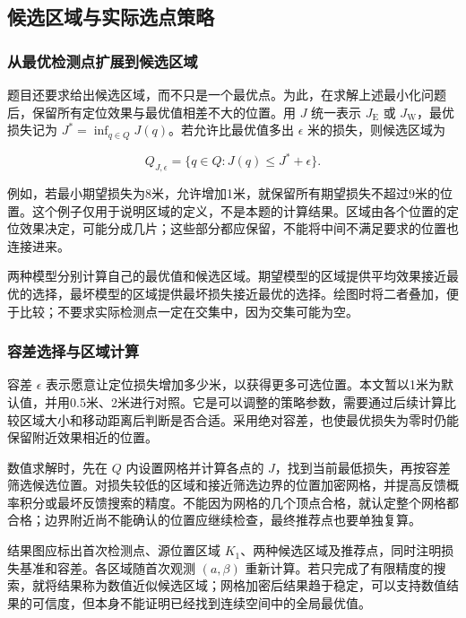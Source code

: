 \subsection{候选区域与实际选点策略}

\subsubsection{从最优检测点扩展到候选区域}

题目还要求给出候选区域，而不只是一个最优点。为此，在求解上述最小化问题后，保留所有定位效果与最优值相差不大的位置。用 \(J\) 统一表示 \(J_{\mathrm E}\) 或 \(J_{\mathrm W}\)，最优损失记为 \(J^*=\inf_{q\in Q}J(q)\)。若允许比最优值多出 \(\epsilon\) 米的损失，则候选区域为

\begin{equation}
 Q_{J,\epsilon}=\{q\in Q:J(q)\le J^*+\epsilon\}.
 \label{eq:q2-candidate-region}
\end{equation}

例如，若最小期望损失为8米，允许增加1米，就保留所有期望损失不超过9米的位置。这个例子仅用于说明区域的定义，不是本题的计算结果。区域由各个位置的定位效果决定，可能分成几片；这些部分都应保留，不能将中间不满足要求的位置也连接进来。

两种模型分别计算自己的最优值和候选区域。期望模型的区域提供平均效果接近最优的选择，最坏模型的区域提供最坏损失接近最优的选择。绘图时将二者叠加，便于比较；不要求实际检测点一定在交集中，因为交集可能为空。

\subsubsection{容差选择与区域计算}

容差 \(\epsilon\) 表示愿意让定位损失增加多少米，以获得更多可选位置。本文暂以1米为默认值，并用0.5米、2米进行对照。它是可以调整的策略参数，需要通过后续计算比较区域大小和移动距离后判断是否合适。采用绝对容差，也使最优损失为零时仍能保留附近效果相近的位置。

数值求解时，先在 \(Q\) 内设置网格并计算各点的 \(J\)，找到当前最低损失，再按容差筛选候选位置。对损失较低的区域和接近筛选边界的位置加密网格，并提高反馈概率积分或最坏反馈搜索的精度。不能因为网格的几个顶点合格，就认定整个网格都合格；边界附近尚不能确认的位置应继续检查，最终推荐点也要单独复算。

结果图应标出首次检测点、源位置区域 \(K_1\)、两种候选区域及推荐点，同时注明损失基准和容差。各区域随首次观测 \((a,\beta)\) 重新计算。若只完成了有限精度的搜索，就将结果称为数值近似候选区域；网格加密后结果趋于稳定，可以支持数值结果的可信度，但本身不能证明已经找到连续空间中的全局最优值。

